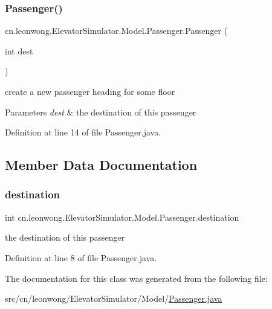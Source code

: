 \subsubsection{\texorpdfstring{Passenger()}{Passenger()}}
{\footnotesize\ttfamily cn.\+leonwong.\+Elevator\+Simulator.\+Model.\+Passenger.\+Passenger (\begin{DoxyParamCaption}\item[{int}]{dest }\end{DoxyParamCaption})}

create a new passenger heading for some floor 
\begin{DoxyParams}{Parameters}
{\em dest} & the destination of this passenger \\
\hline
\end{DoxyParams}


Definition at line 14 of file Passenger.\+java.



\subsection{Member Data Documentation}
\mbox{\label{classcn_1_1leonwong_1_1_elevator_simulator_1_1_model_1_1_passenger_aedd16227b36632abd3c74bb311993847}} 
\subsubsection{\texorpdfstring{destination}{destination}}
{\footnotesize\ttfamily int cn.\+leonwong.\+Elevator\+Simulator.\+Model.\+Passenger.\+destination}



the destination of this passenger 



Definition at line 8 of file Passenger.\+java.



The documentation for this class was generated from the following file\+:\begin{DoxyCompactItemize}
\item 
src/cn/leonwong/\+Elevator\+Simulator/\+Model/\hyperlink{_passenger_8java}{Passenger.\+java}\end{DoxyCompactItemize}
